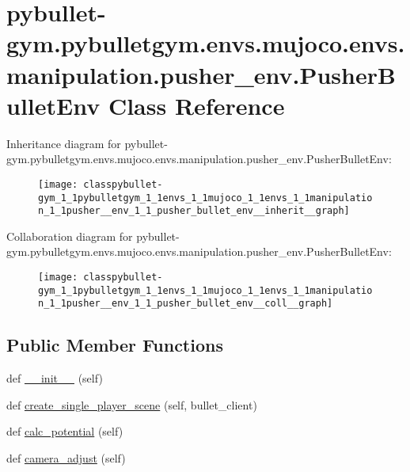 \hypertarget{classpybullet-gym_1_1pybulletgym_1_1envs_1_1mujoco_1_1envs_1_1manipulation_1_1pusher__env_1_1_pusher_bullet_env}{}\section{pybullet-\/gym.pybulletgym.\+envs.\+mujoco.\+envs.\+manipulation.\+pusher\+\_\+env.\+Pusher\+Bullet\+Env Class Reference}
\label{classpybullet-gym_1_1pybulletgym_1_1envs_1_1mujoco_1_1envs_1_1manipulation_1_1pusher__env_1_1_pusher_bullet_env}


Inheritance diagram for pybullet-\/gym.pybulletgym.\+envs.\+mujoco.\+envs.\+manipulation.\+pusher\+\_\+env.\+Pusher\+Bullet\+Env\+:
\nopagebreak
\begin{figure}[H]
\begin{center}
\leavevmode
\texttt{[image: classpybullet-gym\_1\_1pybulletgym\_1\_1envs\_1\_1mujoco\_1\_1envs\_1\_1manipulation\_1\_1pusher\_\_env\_1\_1\_pusher\_bullet\_env\_\_inherit\_\_graph]}
\end{center}
\end{figure}


Collaboration diagram for pybullet-\/gym.pybulletgym.\+envs.\+mujoco.\+envs.\+manipulation.\+pusher\+\_\+env.\+Pusher\+Bullet\+Env\+:
\nopagebreak
\begin{figure}[H]
\begin{center}
\leavevmode
\texttt{[image: classpybullet-gym\_1\_1pybulletgym\_1\_1envs\_1\_1mujoco\_1\_1envs\_1\_1manipulation\_1\_1pusher\_\_env\_1\_1\_pusher\_bullet\_env\_\_coll\_\_graph]}
\end{center}
\end{figure}
\subsection*{Public Member Functions}
\begin{DoxyCompactItemize}
\item 
def \hyperlink{classpybullet-gym_1_1pybulletgym_1_1envs_1_1mujoco_1_1envs_1_1manipulation_1_1pusher__env_1_1_pusher_bullet_env_a57a98d98e02d60aba38d7939b087c809}{\+\_\+\+\_\+init\+\_\+\+\_\+} (self)
\item 
def \hyperlink{classpybullet-gym_1_1pybulletgym_1_1envs_1_1mujoco_1_1envs_1_1manipulation_1_1pusher__env_1_1_pusher_bullet_env_a9d4dfa3925e9079552e5d0a968b50953}{create\+\_\+single\+\_\+player\+\_\+scene} (self, bullet\+\_\+client)
\item 
def \hyperlink{classpybullet-gym_1_1pybulletgym_1_1envs_1_1mujoco_1_1envs_1_1manipulation_1_1pusher__env_1_1_pusher_bullet_env_ace442d5214f99ce968eb365dd35e5e4a}{calc\+\_\+potential} (self)
\item 
def \hyperlink{classpybullet-gym_1_1pybulletgym_1_1envs_1_1mujoco_1_1envs_1_1manipulation_1_1pusher__env_1_1_pusher_bullet_env_aed94bf67fd8f1b6a0bf306723fa574f5}{camera\+\_\+adjust} (self)
\end{DoxyCompactItemize}
